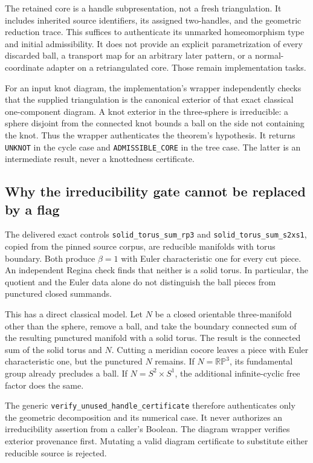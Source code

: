 The retained core is a handle subpresentation, not a fresh triangulation.
It includes inherited source identifiers, its assigned two-handles, and
the geometric reduction trace.  This suffices to authenticate its unmarked
homeomorphism type and initial admissibility.  It does not provide an
explicit parametrization of every discarded ball, a transport map for an
arbitrary later pattern, or a normal-coordinate adapter on a retriangulated
core.  Those remain implementation tasks.

For an input knot diagram, the implementation's wrapper independently checks
that the supplied triangulation is the canonical exterior of that exact
classical one-component diagram.  A knot exterior in the three-sphere is
irreducible: a sphere disjoint from the connected knot bounds a ball on the
side not containing the knot.  Thus the wrapper authenticates the theorem's
hypothesis.  It returns \texttt{UNKNOT} in the cycle case and
\texttt{ADMISSIBLE\_CORE} in the tree case.  The latter is an intermediate
result, never a knottedness certificate.

\subsection{Why the irreducibility gate cannot be replaced by a flag}

The delivered exact controls \texttt{solid\_torus\_sum\_rp3} and
\texttt{solid\_torus\_sum\_s2xs1}, copied from the pinned source corpus,
are reducible manifolds with torus boundary.  Both produce $\beta=1$ with
Euler characteristic one for every cut piece.  An independent Regina
check finds that neither is a solid torus.  In particular, the quotient
and the Euler data alone do not distinguish the ball pieces from punctured
closed summands.

This has a direct classical model.  Let $N$ be a closed orientable
three-manifold other than the sphere, remove a ball, and take the boundary
connected sum of the resulting punctured manifold with a solid torus.
The result is the connected sum of the solid torus and $N$.  Cutting a
meridian cocore leaves a piece with Euler characteristic one, but the
punctured $N$ remains.  If $N=\mathbb{RP}^3$, its fundamental group already
precludes a ball.  If $N=S^2\times S^1$, the additional infinite-cyclic
free factor does the same.

The generic \texttt{verify\_unused\_handle\_certificate} therefore
authenticates only the geometric decomposition and its numerical case.
It never authorizes an irreducibility assertion from a caller's Boolean.
The diagram wrapper verifies exterior provenance first.  Mutating a valid
diagram certificate to substitute either reducible source is rejected.

